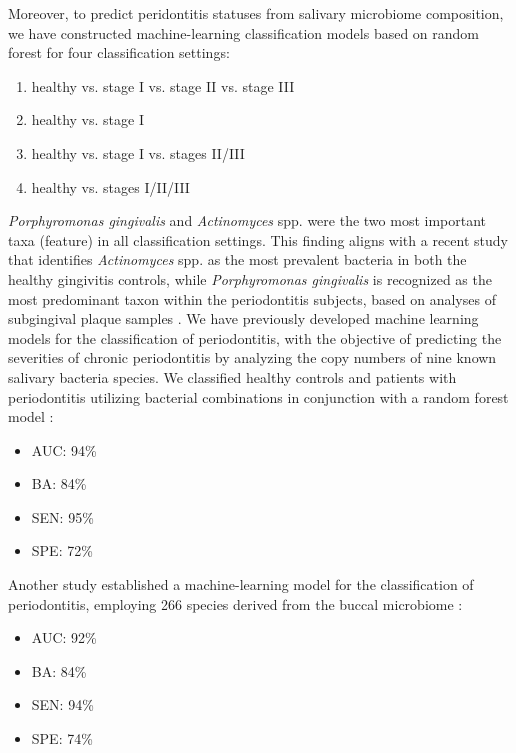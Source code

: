 \documentclass[11pt, a4paper, onecolumn, oneside]{report}
\begin{document}
            Moreover, to predict peridontitis statuses from salivary microbiome composition, we have constructed machine-learning classification models based on random forest for four classification settings:
            \begin{enumerate}
                \item healthy vs. stage I vs. stage II vs. stage III
                \item healthy vs. stage I
                \item healthy vs. stage I vs. stages II/III
                \item healthy vs. stages I/II/III
            \end{enumerate}
            \textit{Porphyromonas gingivalis} and \textit{Actinomyces} spp. were the two most important taxa (feature) in all classification settings. This finding aligns with a recent study that identifies \textit{Actinomyces} spp. as the most prevalent bacteria in both the healthy gingivitis controls, while \textit{Porphyromonas gingivalis} is recognized as the most predominant taxon within the periodontitis subjects, based on analyses of subgingival plaque samples \cite{Periodontitis-11}. We have previously developed machine learning models for the classification of periodontitis, with the objective of predicting the severities of chronic periodontitis by analyzing the copy numbers of nine known salivary bacteria species. We classified healthy controls and patients with periodontitis utilizing bacterial combinations in conjunction with a random forest model \cite{Periodontitis-diagnosis-8}:
            \begin{itemize}[noitemsep,nolistsep]
                \item AUC: 94\%
                \item BA: 84\%
                \item SEN: 95\%
                \item SPE: 72\%
            \end{itemize}

            Another study established a machine-learning model for the classification of periodontitis, employing 266 species derived from the buccal microbiome \cite{Periodontitis-35}:
            \begin{itemize}[noitemsep,nolistsep]
                \item AUC: 92\%
                \item BA: 84\%
                \item SEN: 94\%
                \item SPE: 74\%
            \end{itemize}
\end{document}
